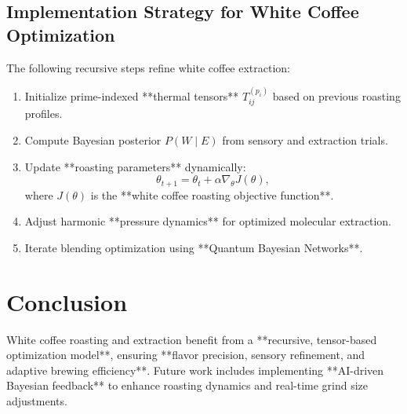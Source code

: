 \documentclass{article}
\theoremstyle{plain}
\theoremstyle{claimstyle}
\begin{document}
\subsection{Implementation Strategy for White Coffee Optimization}
The following recursive steps refine white coffee extraction:
\begin{enumerate}
    \item Initialize prime-indexed **thermal tensors** \( T_{ij}^{(p_i)} \) based on previous roasting profiles.
    \item Compute Bayesian posterior \( P(W \mid E) \) from sensory and extraction trials.
    \item Update **roasting parameters** dynamically:
    \begin{equation}
    \theta_{t+1} = \theta_t + \alpha \nabla_\theta J(\theta),
    \end{equation}
    where \( J(\theta) \) is the **white coffee roasting objective function**.
    \item Adjust harmonic **pressure dynamics** for optimized molecular extraction.
    \item Iterate blending optimization using **Quantum Bayesian Networks**.
\end{enumerate}

\section{Conclusion}
White coffee roasting and extraction benefit from a **recursive, tensor-based optimization model**, ensuring **flavor precision, sensory refinement, and adaptive brewing efficiency**. Future work includes implementing **AI-driven Bayesian feedback** to enhance roasting dynamics and real-time grind size adjustments.

\nocite{*}


\end{document}
